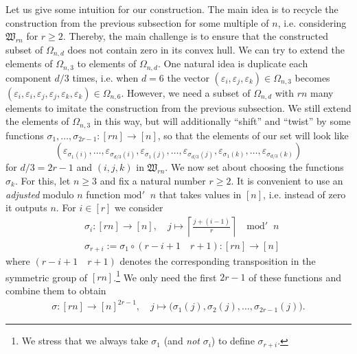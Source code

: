 \documentclass[10pt,a4paper]{article}
\numberwithin{equation}{section}
\newcommand{\eps}{\varepsilon}
\begin{document}
Let us give some intuition for our construction. The main idea is to recycle the construction from the previous subsection for some multiple of $n$, i.e. considering $\mathfrak{W}_{rn}$ for $r \geq 2$. Thereby, the main challenge is to ensure that the constructed subset of $\Omega_{n,d}$ does not contain zero in its convex hull. We can try to extend the elements of $\Omega_{n,3}$ to elements of $\Omega_{n,d}$. One natural idea is duplicate each component $d/3$ times, i.e. when $d=6$ the vector $(\eps_i, \eps_j, \eps_k) \in \Omega_{n,3}$ becomes $(\eps_i, \eps_i, \eps_j, \eps_j, \eps_k, \eps_k) \in \Omega_{n,6}$. However, we need a subset of $\Omega_{n,d}$ with $rn$ many elements to imitate the construction from the previous subsection. We still extend the elements of $\Omega_{n,3}$ in this way, but will additionally ``shift'' and ``twist'' by some functions $\sigma_1, \dots, \sigma_{2r-1} \colon [rn] \to [n]$, so that the elements of our set will look like 
$$
\left( \eps_{\sigma_1(i)}, \ldots, \eps_{\sigma_{d/3}(i)},
	\eps_{\sigma_1(j)}, \ldots, \eps_{\sigma_{d/3}(j)}, \eps_{\sigma_1(k)}, \ldots, \eps_{\sigma_{d/3}(k)} \right)
  $$
for $d/3 = 2r-1$ and $(i,j,k)$ in $\mathfrak{W}_{rn}$. We now set about choosing the functions $\sigma_k$. For this, let $n \geq 3$ and fix a natural number $r \geq 2$. It is convenient to use an \emph{adjusted} modulo $n$ function $\mathrm{mod}' \;\; n$ that takes values in $[n]$, i.e. instead of zero it outputs $n$.
For $i \in [r]$ we consider
	\begin{align*}
	&\sigma_{i} \colon [r n] \to [n], \quad j \mapsto \left\lceil \frac{j + (i-1)}{r} \right\rceil \quad \mathrm{mod}' \;\; n \\
	&\sigma_{r + i} := \sigma_1 \circ (r - i + 1 \quad r + 1) \colon [rn] \to [n]
	\end{align*}
where $(r - i + 1 \quad r + 1)$ denotes the corresponding transposition in the symmetric group of $[rn]$.\footnote{We stress that we always take $\sigma_1$ (and \emph{not} $\sigma_i$) to define $\sigma_{r+i}$.} We only need the first $2 r - 1$ of these functions and combine them to obtain 
	\begin{align*}
	\sigma \colon [r n] \to [n]^{2 r - 1}, \quad j \mapsto \big( \sigma_1(j), \sigma_2(j),\ldots, \sigma_{2 r - 1}(j) \big).
	\end{align*}
\end{document}
